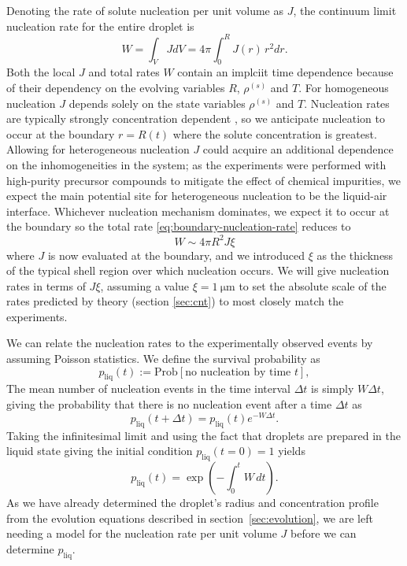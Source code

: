\documentclass[11pt,twoside]{report}
\begin{document}
Denoting the rate of solute nucleation per unit volume as $J$, the continuum limit nucleation rate for the entire droplet is
\begin{equation}\label{eq:droplet-nucleation-rate}
  W
  =
  \int_V J dV
  =
  4\pi \int_0^R J(r) \, r^2 dr.
\end{equation}
Both the local $J$ and total rates $W$ contain an implciit time dependence because of their dependency on the evolving variables $R$, $\rho^{(s)}$ and $T$.
For homogeneous nucleation $J$ depends solely on the state variables $\rho^{(s)}$ and $T$.
Nucleation rates are typically strongly concentration dependent \cite{ValerianiJCP2005,DesarnaudJPCL2014,SearJPCM2007}, so we anticipate nucleation to occur at the boundary $r=R(t)$ where the solute concentration is greatest.
Allowing for heterogeneous nucleation $J$ could acquire an additional dependence on the inhomogeneities in the system; as the experiments were performed with high-purity precursor compounds to mitigate the effect of chemical impurities, we expect the main potential site for heterogeneous nucleation to be the liquid-air interface.
Whichever nucleation mechanism dominates, we expect it to occur at the boundary so the total rate \eqref{eq:boundary-nucleation-rate} reduces to
\begin{equation}\label{eq:boundary-nucleation-rate}
  W
  \sim
  4\pi R^2 J \xi
\end{equation}
where $J$ is now evaluated at the boundary, and we introduced $\xi$ as the thickness of the typical shell region over which nucleation occurs.
We will give nucleation rates in terms of $J \xi$, assuming a value $\xi = \SI{1}{\micro\metre}$ to set the absolute scale of the rates predicted by theory (section \ref{sec:cnt}) to most closely match the experiments.

We can relate the nucleation rates to the experimentally observed events by assuming Poisson statistics.
We define the survival probability as
\begin{equation*}
  p_\mathrm{liq}(t)
  :=
  \textrm{Prob}\left[ \textrm{no nucleation by time } t \right],
\end{equation*}
The mean number of nucleation events in the time interval $\Delta t$ is simply $W \Delta t$, giving the probability that there is no nucleation event after a time $\Delta t$ as
\begin{equation*}
  p_\mathrm{liq}(t + \Delta t) = p_\mathrm{liq}(t) e^{-W \Delta t}.
\end{equation*}
Taking the infinitesimal limit and using the fact that droplets are prepared in the liquid state giving the initial condition $p_\mathrm{liq}(t=0) = 1$ yields
\begin{equation}\label{eq:survival}
  p_\mathrm{liq}(t)
  =
  \exp{\left( -\int_0^t W \, dt \right)}.
\end{equation}
As we have already determined the droplet's radius and concentration profile from the evolution equations described in section\ \ref{sec:evolution}, we are left needing a model for the nucleation rate per unit volume $J$ before we can determine $p_\mathrm{liq}$.
\end{document}
